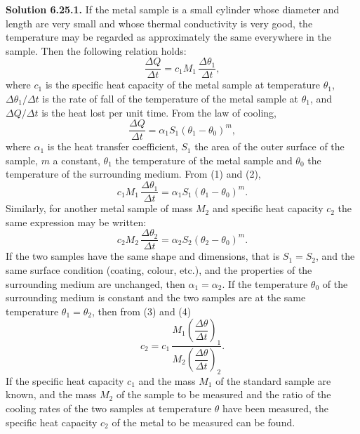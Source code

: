 \medskip
\noindent\textbf{Solution 6.25.}\quad \textbf{1.} If the metal sample is a small cylinder whose diameter and length are very small and whose thermal conductivity is very good, the temperature may be regarded as approximately the same everywhere in the sample. Then the following relation holds:
\begin{equation}\tag{1}
\frac{\Delta Q}{\Delta t}=c_1M_1\,\frac{\Delta\theta_1}{\Delta t},
\end{equation}
where $c_1$ is the specific heat capacity of the metal sample at temperature $\theta_1$, $\Delta\theta_1/\Delta t$ is the rate of fall of the temperature of the metal sample at $\theta_1$, and $\Delta Q/\Delta t$ is the heat lost per unit time. From the law of cooling,
\begin{equation}\tag{2}
\frac{\Delta Q}{\Delta t}=\alpha_1S_1(\theta_1-\theta_0)^{m},
\end{equation}
where $\alpha_1$ is the heat transfer coefficient, $S_1$ the area of the outer surface of the sample, $m$ a constant, $\theta_1$ the temperature of the metal sample and $\theta_0$ the temperature of the surrounding medium. From (1) and (2),
\begin{equation}\tag{3}
c_1M_1\,\frac{\Delta\theta_1}{\Delta t}=\alpha_1S_1(\theta_1-\theta_0)^{m}.
\end{equation}
Similarly, for another metal sample of mass $M_2$ and specific heat capacity $c_2$ the same expression may be written:
\begin{equation}\tag{4}
c_2M_2\,\frac{\Delta\theta_2}{\Delta t}=\alpha_2S_2(\theta_2-\theta_0)^{m}.
\end{equation}
If the two samples have the same shape and dimensions, that is $S_1=S_2$, and the same surface condition (coating, colour, etc.), and the properties of the surrounding medium are unchanged, then $\alpha_1=\alpha_2$. If the temperature $\theta_0$ of the surrounding medium is constant and the two samples are at the same temperature $\theta_1=\theta_2$, then from (3) and (4)
\begin{equation}\tag{5}
c_2=c_1\,\frac{M_1\left(\dfrac{\Delta\theta}{\Delta t}\right)_1}{M_2\left(\dfrac{\Delta\theta}{\Delta t}\right)_2}.
\end{equation}
If the specific heat capacity $c_1$ and the mass $M_1$ of the standard sample are known, and the mass $M_2$ of the sample to be measured and the ratio of the cooling rates of the two samples at temperature $\theta$ have been measured, the specific heat capacity $c_2$ of the metal to be measured can be found.

